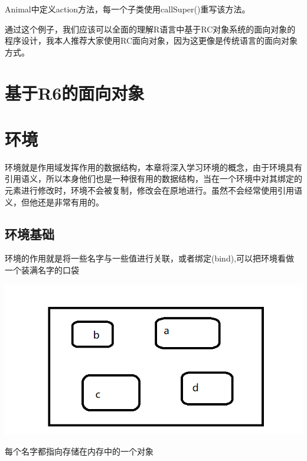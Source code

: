 \documentclass[]{book}
\newenvironment{Shaded}{\begin{snugshade}}{\end{snugshade}}
\newcommand{\KeywordTok}[1]{\textcolor[rgb]{0.13,0.29,0.53}{\textbf{#1}}}
\newcommand{\DecValTok}[1]{\textcolor[rgb]{0.00,0.00,0.81}{#1}}
\newcommand{\FloatTok}[1]{\textcolor[rgb]{0.00,0.00,0.81}{#1}}
\newcommand{\StringTok}[1]{\textcolor[rgb]{0.31,0.60,0.02}{#1}}
\newcommand{\OtherTok}[1]{\textcolor[rgb]{0.56,0.35,0.01}{#1}}
\newcommand{\OperatorTok}[1]{\textcolor[rgb]{0.81,0.36,0.00}{\textbf{#1}}}
\newcommand{\NormalTok}[1]{#1}
\begin{document}
Animal中定义action方法，每一个子类使用callSuper()重写该方法。

通过这个例子，我们应该可以全面的理解R语言中基于RC对象系统的面向对象的程序设计，我本人推荐大家使用RC面向对象，因为这更像是传统语言的面向对象方式。

\chapter{基于R6的面向对象}\label{R6}

\chapter{环境}\label{env}

环境就是作用域发挥作用的数据结构，本章将深入学习环境的概念，由于环境具有引用语义，所以本身他们也是一种很有用的数据结构，当在一个环境中对其绑定的元素进行修改时，环境不会被复制，修改会在原地进行。虽然不会经常使用引用语义，但他还是非常有用的。

\section{环境基础}

环境的作用就是将一些名字与一些值进行关联，或者绑定(bind),可以把环境看做一个装满名字的口袋

\begin{center}\includegraphics{img/ch7-1} \end{center}

每个名字都指向存储在内存中的一个对象

\begin{Shaded}
\end{Shaded}
\end{document}
